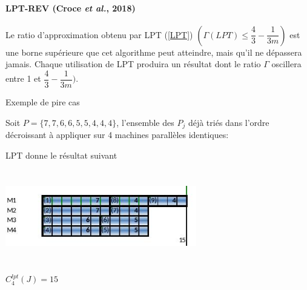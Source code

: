 \documentclass[a4paper,12pt]{report}
\theoremstyle{plain}				%
\theoremstyle{definition}				%
\begin{document}

\paragraph{LPT-REV (Croce \textit{et al.}, 2018)}

Le ratio d'approximation obtenu par LPT (\ref{LPT})
$(\Gamma(LPT)\leq \dfrac{4}{3} - \dfrac{1}{3m})$ est une borne
supérieure que cet algorithme peut atteindre, mais qu'il ne dépassera
jamais.
Chaque utilisation de LPT produira un résultat dont le ratio $\Gamma$
oscillera entre 1 et $\dfrac{4}{3} - \dfrac{1}{3m})$.

\bigskip
Exemple de pire cas

Soit $P=\{7,7,6,6,5,5,4,4,4\}$, l'ensemble des $P_j$ déjà triés dans
l'ordre décroissant à appliquer sur 4 machines parallèles identiques:

\bigskip

\begin{minipage}{\linewidth}

\begin{flushleft}
LPT donne le résultat suivant
\end{flushleft}
{\centering
\includegraphics[width=8.334cm,height=4.034cm]{Biblio_PCmax_Rendu_exLPT_Rev1.jpg}
\par}

\begin{flushleft}
$C_4^{lpt}(J)=15$
\end{flushleft}

\end{minipage}

\bigskip
\end{document}
